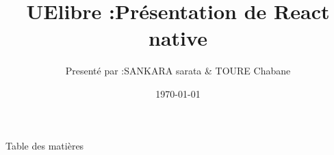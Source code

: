\documentclass[5pt]{beamer}
\title{UElibre :Présentation de React native }
\institute{IFNTI S4}
\author{Presenté par :SANKARA sarata \& TOURE Chabane}
\date{\today}
\begin{document}
{
\begin{frame}[plain]
	\titlepage\end{frame}
}

\begin{frame}{Table des matières}
	\tableofcontents
\end{frame}
\end{document}

